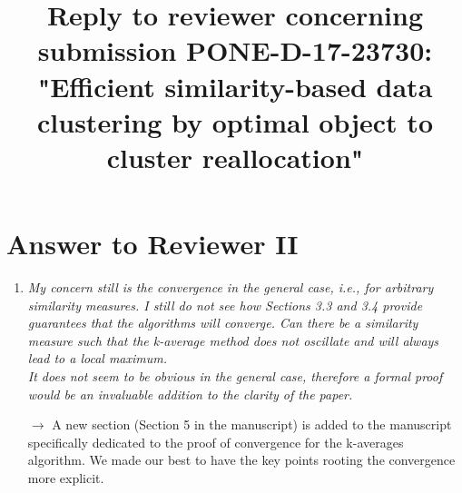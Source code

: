 \documentclass[10pt]{article}
\title{Reply to reviewer concerning submission PONE-D-17-23730: "Efficient similarity-based data clustering by optimal object to cluster reallocation"}
\begin{document}
\maketitle

\section{Answer to Reviewer II}

\begin{enumerate}

\item \emph{My concern still is the convergence in the general case, i.e., for arbitrary similarity measures. I still do not see how Sections 3.3 and 3.4 provide guarantees that the algorithms will converge. Can there be a similarity measure such that the k-average method does not oscillate and will always lead to a local maximum.\\
It does not seem to be obvious in the general case, therefore a formal proof would be an invaluable addition to the clarity of the paper.}

$\rightarrow$ A new section (Section 5 in the manuscript) is added to the manuscript specifically dedicated to the proof of convergence for the k-averages algorithm. We made our best to have the key points rooting the convergence more explicit.

\end{enumerate}
\end{document}
